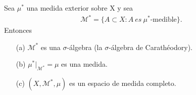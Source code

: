\begin{teo}
    Sea $\mu^*$ una medida exterior sobre X y sea
    \begin{align*}
        \mathcal{M}^* = \{ A \subset X : A \ es \ \mu^*\text{-medible} \}.
    \end{align*}
    Entonces
    \begin{enumerate}
        \item[(a)] $\mathcal{M}^*$ es una $\sigma$-álgebra (la $\sigma$-álgebra de Carathéodory).
        \item[(b)] $\mu^*|_{\mathcal{M}^*} = \mu$ es una medida.
        \item[(c)] $(X, \mathcal{M}^*, \mu)$ es un espacio de medida completo.
    \end{enumerate}
\end{teo}

